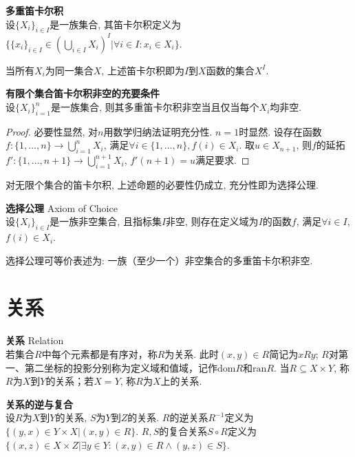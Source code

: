 \begin{dfn} \textbf{多重笛卡尔积}\\
设$\{X_i\}_{i\in I}$是一族集合, 其笛卡尔积定义为$\{\{x_i\}_{i\in I}\in (\bigcup_{i\in I} X_i)^I\vert \forall i\in I: x_i\in X_i\}$. 
\end{dfn}
当所有$X_i$为同一集合$X$, 上述笛卡尔积即为$I$到$X$函数的集合$X^I$. 

\begin{pro}\textbf{有限个集合笛卡尔积非空的充要条件}\\
设$\{X_i\}_{i=1}^n$是一族集合, 则其多重笛卡尔积非空当且仅当每个$X_i$均非空. 
\end{pro}
\begin{proof}
必要性显然, 对$n$用数学归纳法证明充分性. $n=1$时显然. 设存在函数$f: \{1,\dots,n\} \to \bigcup_{i=1}^n X_i$, 满足$\forall i\in \{1,\dots,n\}, f(i)\in X_i$. 取$u\in X_{n+1}$, 则$f$的延拓$f':\{1,\dots,n+1\}\to \bigcup_{i=1}^{n+1} X_i$, $f'(n+1)=u$满足要求. 
\end{proof}
对无限个集合的笛卡尔积, 上述命题的必要性仍成立, 充分性即为选择公理. 

\begin{axi} \textbf{选择公理} Axiom of Choice\\
设$\{X_i\}_{i\in I}$是一族非空集合, 且指标集$I$非空, 则存在定义域为$I$的函数$f$, 满足$\forall i\in I$, $f(i)\in X_i$.
\end{axi}
选择公理可等价表述为: 一族（至少一个）非空集合的多重笛卡尔积非空.

\section{关系}

\begin{dfn} \textbf{关系} Relation\\
若集合$R$中每个元素都是有序对，称$R$为关系. 此时$(x,y)\in R$简记为$xRy$; $R$对第一、第二坐标的投影分别称为定义域和值域，记作$\mathrm{dom}R$和$\mathrm{ran}R$. 当$R\subseteq X\times Y$, 称$R$为$X$到$Y$的关系；若$X=Y$, 称$R$为$X$上的关系. 
\end{dfn}

\begin{dfn} \textbf{关系的逆与复合} \\
设$R$为$X$到$Y$的关系, $S$为$Y$到$Z$的关系. $R$的逆关系$R^{-1}$定义为$\{(y,x)\in Y\times X\vert (x,y)\in R\}$. $R,S$的复合关系$S\circ R$定义为$\{(x,z)\in X\times Z\vert \exists y\in Y: (x,y)\in R \land (y,z)\in S\}$.
\end{dfn}

